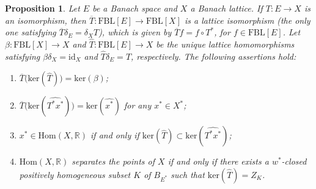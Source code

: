 \documentclass[11pt]{amsart}
\newtheorem{prop}[thm]{Proposition}
\theoremstyle{definition}
\numberwithin{equation}{section}
\newcommand{\fbl}{\text{FBL}}
\begin{document}
\begin{prop}\label{prop:isomorphic-enumeration-BLs}
Let $E$ be a Banach space and $X$ a Banach lattice. If $T:E\to X$ is an isomorphism, then $\overline{T}:\fbl[E]\to \fbl[X]$ is a lattice isomorphism (the only one satisfying $\overline{T}\delta_E=\delta_X T$), which is given by $\overline{T}f=f\circ T^*$, for $f\in \fbl[E]$. Let $\beta:\fbl[X]\to X$ and $\widehat{T}:\fbl[E]\to X$ be the unique lattice homomorphisms satisfying $\beta\delta_X=\text{id}_X$ and $\widehat{T}\delta_E=T$, respectively. The following assertions hold:
\begin{enumerate}
\item $\overline{T}\bigl(\text{ker}(\widehat{T})\bigr)=\text{ker}(\beta)$;
\item $\overline{T}\bigl(\text{ker}(\widehat{T^*x^*})\bigr)=\text{ker}(\widehat{x^*})$ for any $x^*\in X^*$;
\item $x^*\in \text{Hom}(X,\mathbb{R})$ if and only if $\text{ker}(\widehat{T})\subset \text{ker}(\widehat{T^*x^*})$;
    \item $\text{Hom}(X,\mathbb{R})$ separates the points of $X$ if and only if there exists a $w^*$-closed positively homogeneous subset $K$ of $B_{E^*}$ such that $\text{ker}(\widehat{T})=Z_K$.   
\end{enumerate} 
\end{prop}
\end{document}
